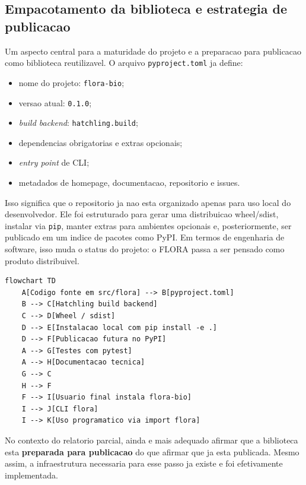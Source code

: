 \documentclass[12pt,a4paper]{article}
\begin{document}
\subsection{Empacotamento da biblioteca e estrategia de publicacao}

Um aspecto central para a maturidade do projeto e a preparacao para publicacao como biblioteca reutilizavel. O arquivo \texttt{pyproject.toml} ja define:

\begin{itemize}[leftmargin=1.5cm]
    \item nome do projeto: \texttt{flora-bio};
    \item versao atual: \texttt{0.1.0};
    \item \textit{build backend}: \texttt{hatchling.build};
    \item dependencias obrigatorias e extras opcionais;
    \item \textit{entry point} de CLI;
    \item metadados de homepage, documentacao, repositorio e issues.
\end{itemize}

Isso significa que o repositorio ja nao esta organizado apenas para uso local do desenvolvedor. Ele foi estruturado para gerar uma distribuicao wheel/sdist, instalar via \texttt{pip}, manter extras para ambientes opcionais e, posteriormente, ser publicado em um indice de pacotes como PyPI. Em termos de engenharia de software, isso muda o status do projeto: o FLORA passa a ser pensado como produto distribuivel.

\begin{lstlisting}[style=mermaid,caption={Diagrama Mermaid do ciclo de empacotamento e publicacao da biblioteca.},label={lst:mermaid_publish}]
flowchart TD
    A[Codigo fonte em src/flora] --> B[pyproject.toml]
    B --> C[Hatchling build backend]
    C --> D[Wheel / sdist]
    D --> E[Instalacao local com pip install -e .]
    D --> F[Publicacao futura no PyPI]
    A --> G[Testes com pytest]
    A --> H[Documentacao tecnica]
    G --> C
    H --> F
    F --> I[Usuario final instala flora-bio]
    I --> J[CLI flora]
    I --> K[Uso programatico via import flora]
\end{lstlisting}

No contexto do relatorio parcial, ainda e mais adequado afirmar que a biblioteca esta \textbf{preparada para publicacao} do que afirmar que ja esta publicada. Mesmo assim, a infraestrutura necessaria para esse passo ja existe e foi efetivamente implementada.
\end{document}
